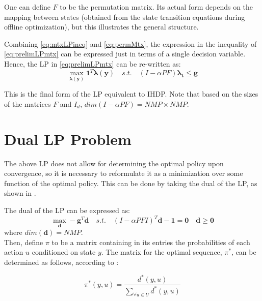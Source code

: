 \documentclass[conference]{IEEEtran}
\begin{document}
One can define $F$ to be the permutation matrix. Its actual form depends on the mapping between states (obtained from the state transition equations during offline optimization), but this illustrates the general structure.

Combining \eqref{eq:mtxLPineq} and \eqref{eq:permMtx}, the expression in the inequality of \eqref{eq:prelimLPmtx} can be expressed just in terms of a single decision variable. Hence, the LP in \eqref{eq:prelimLPmtx} can be re-written as:
\begin{equation} \label{eq:LPfinal}
    \max_{\boldsymbol{\lambda(y)}} \boldsymbol{1}^{T} \boldsymbol{\lambda(y)}
    \hspace{1em}s.t.\hspace{1em}
    (I-\alpha PF)\boldsymbol{\lambda_{t}} \leq \boldsymbol{g}
\end{equation}

This is the final form of the LP equivalent to IHDP. Note that based on the sizes of the matrices $F$ and $I_{d}$, $dim(I-\alpha PF) = NMP\times NMP$.

\section{Dual LP Problem}
The above LP does not allow for determining the optimal policy upon convergence, so it is necessary to reformulate it as a minimization over some function of the optimal policy. This can be done by taking the dual of the LP, as shown in \cite{4220813}.

The dual of the LP can be expressed as:
\begin{equation}
    \max_{\boldsymbol{d}} -\boldsymbol{g}^{T} \boldsymbol{d}
    \hspace{1em}s.t.\hspace{1em}(I-\alpha PFI)^{T}\boldsymbol{d} - \boldsymbol{1} = \boldsymbol{0}\hspace{1em}\boldsymbol{d} \geq \boldsymbol{0}
\end{equation}
where $dim(\boldsymbol{d})=NMP$.\\

Then, define $\pi$ to be a matrix containing in its entries the probabilities of each action $u$ conditioned on state $y$. The matrix for the optimal sequence, $\pi^{*}$, can be determined as follows, according to \cite{4220813}:

\begin{equation}
\pi^{*}(y,u)=\frac{d^{*}(y,u)}{\sum_{\forall u \in U}d^{*}(y,u)}
\end{equation}
\end{document}
